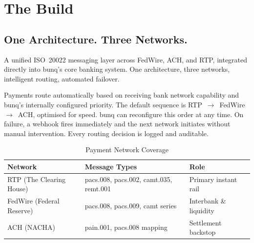 
\section{The Build}

\subsection{One Architecture. Three Networks.}

A unified ISO~20022 messaging layer across FedWire, ACH, and RTP, integrated directly into bunq's core banking system. One architecture, three networks, intelligent routing, automated failover.

Payments route automatically based on receiving bank network capability and bunq's internally configured priority. The default sequence is RTP~$\to$~FedWire~$\to$~ACH, optimised for speed. bunq can reconfigure this order at any time. On failure, a webhook fires immediately and the next network initiates without manual intervention. Every routing decision is logged and auditable.

\begin{table}[ht]
\centering
\caption{Payment Network Coverage}
\begin{tabularx}{\textwidth}{@{}l X l@{}}
\toprule
\textbf{Network} & \textbf{Message Types} & \textbf{Role} \\
\midrule
RTP (The Clearing House) & pacs.008, pacs.002, camt.035, remt.001 & Primary instant rail \\[4pt]
FedWire (Federal Reserve) & pacs.008, pacs.009, camt series & Interbank \& liquidity \\[4pt]
ACH (NACHA) & pain.001, pacs.008 mapping & Settlement backstop \\
\bottomrule
\end{tabularx}
\end{table}
